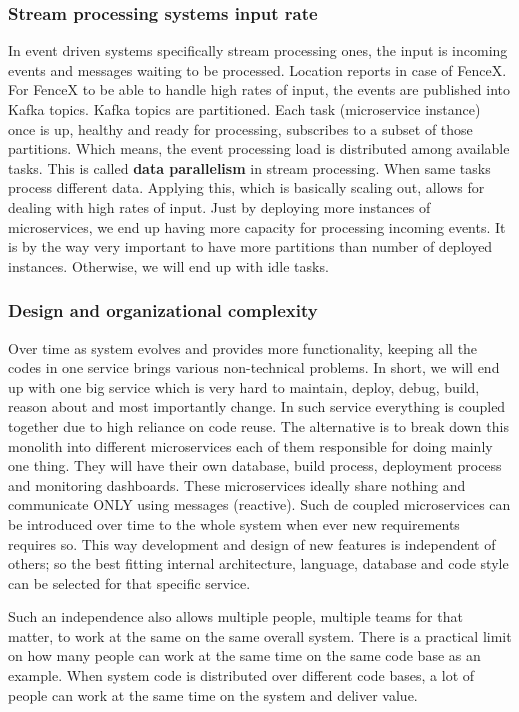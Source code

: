 \documentclass[a4]{report}
\begin{document}
    \subsubsection{Stream processing systems input rate}
    In event driven systems specifically stream processing ones, the input is incoming events and messages waiting to
    be processed.
    Location reports in case of FenceX.
    For FenceX to be able to handle high rates of input, the events are published into Kafka topics.
    Kafka topics are partitioned.
    Each task (microservice instance) once is up, healthy and ready for processing, subscribes to a subset of those
    partitions.
    Which means, the event processing load is distributed among available tasks.
    This is called \textbf{data parallelism} in stream processing.
    When same tasks process different data.
    Applying this, which is basically scaling out, allows for dealing with high rates of input.
    Just by deploying more instances of microservices, we end up having more capacity for processing incoming events.
    It is by the way very important to have more partitions than number of deployed instances.
    Otherwise, we will end up with idle tasks.

    \subsubsection{Design and organizational complexity}
    Over time as system evolves and provides more functionality, keeping all the codes in one service brings various
    non-technical problems.
    In short, we will end up with one big service which is very hard to maintain, deploy, debug, build, reason about
    and most importantly change.
    In such service everything is coupled together due to high reliance on code reuse.
    The alternative is to break down this monolith into different microservices each of them responsible for doing
    mainly one thing.
    They will have their own database, build process, deployment process and monitoring dashboards.
    These microservices ideally share nothing and communicate ONLY using messages (reactive).
    Such de coupled microservices can be introduced over time to the whole system when ever new requirements requires so.
    This way development and design of new features is independent of others;
    so the best fitting internal architecture, language, database and code style can be selected for that specific service.

    Such an independence also allows multiple people, multiple teams for that matter, to work at the same on the same
    overall system.
    There is a practical limit on how many people can work at the same time on the same code base as an example.
    When system code is distributed over different code bases, a lot of people can work at the same time on the
    system and deliver value.
\end{document}

